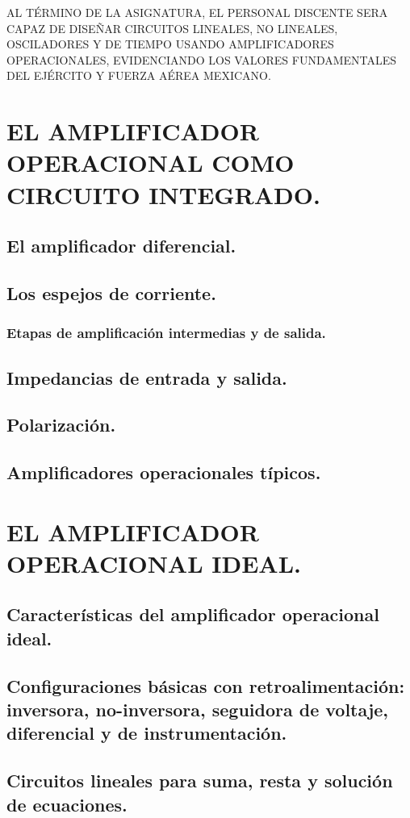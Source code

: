 \documentclass{myarticle}
\begin{document}
\noindent
AL TÉRMINO DE LA ASIGNATURA, EL PERSONAL DISCENTE SERA CAPAZ DE DISEÑAR CIRCUITOS LINEALES, NO LINEALES, OS\-CI\-LA\-DO\-RES Y DE TIEMPO USANDO AMPLIFICADORES OPERACIONALES, EVIDENCIANDO LOS VALORES FUNDAMENTALES DEL EJÉRCITO Y FUERZA AÉREA MEXICANO.
\tableofcontents
\section{ EL AMPLIFICADOR OPERACIONAL COMO CIRCUITO INTEGRADO.}
\subsection*{El amplificador diferencial.}
\subsection*{Los espejos de corriente.}
\subsubsection*{Etapas de amplificación intermedias y de salida.}
\subsection*{Impedancias de entrada y salida.}
\subsection*{Polarización.}
\subsection*{Amplificadores operacionales típicos.}
\section{ EL AMPLIFICADOR OPERACIONAL IDEAL.}
\subsection*{Características del amplificador operacional ideal.}
\subsection*{Configuraciones básicas con retroalimentación: inversora, no-inversora, seguidora de voltaje, diferencial y de instrumentación.}
\subsection*{Circuitos lineales para suma, resta y solución de ecuaciones.}
\end{document}
